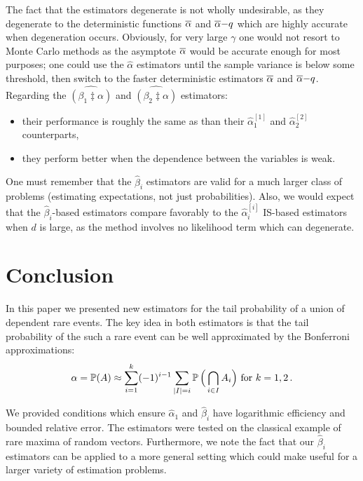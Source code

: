 The fact that the estimators degenerate is not wholly undesirable, as they degenerate to the deterministic functions $\overline{\alpha}$ and $\overline{\alpha}{-}q$ which are highly accurate when degeneration occurs. Obviously, for very large $\gamma$ one would not resort to Monte Carlo methods as the asymptote $\overline{\alpha}$ would be accurate enough for most purposes; one could use the $\hat{\alpha}$ estimators until the sample variance is below some threshold, then switch to the faster deterministic estimators $\overline{\alpha}$ and $\overline{\alpha}{-}q$. \\

\noindent
Regarding the $\widehat{(\beta_1 \ddagger \alpha)}$ and $\widehat{(\beta_2 \ddagger \alpha)}$ estimators:
\begin{itemize}
\item their performance is roughly the same as than their $\hat{\alpha}_1^{[1]}$ and $\hat{\alpha}_2^{[2]}$ counterparts,
\item they perform better when the dependence between the variables is weak.
\end{itemize}
One must remember that the $\hat{\beta}_i$ estimators are valid for a much larger class of problems (estimating expectations, not just probabilities). Also, we would expect that the $\hat{\beta}_i$-based estimators compare favorably to the $\hat{\alpha}_i^{[i]}$ IS-based estimators when $d$ is large, as the method involves no likelihood term which can degenerate.



\section{Conclusion}

In this paper we presented new estimators for the tail probability of a union of dependent rare events.
The key idea in both estimators is that the tail probability of the such a rare event can be
well approximated by the Bonferroni approximations:
\begin{align*}
  \alpha = \operatorname{{\mathbb P}}(A) \approx \sum_{i=1}^k (-1)^{i-1} \sum_{|I|= i} \operatorname{{\mathbb P}}\Big(\bigcap_{i\in I}A_i\Big) \text{ for } k=1,2\,.
\end{align*}

We provided conditions which ensure $\hat{\alpha}_1$ and $\hat{\beta}_i$ have logarithmic efficiency and bounded relative error. 
The estimators were tested on the classical example of rare maxima of random vectors.
Furthermore, we note the fact that our $\hat{\beta}_i$ estimators can be applied 
to a more general setting which could make useful for a larger variety of estimation problems.

